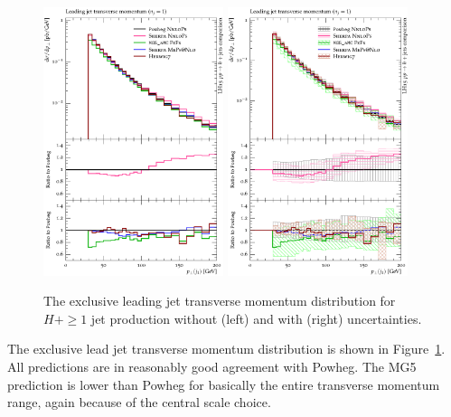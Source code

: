 \begin{figure}[t!]
  \centering
  \includegraphics[width=0.47\textwidth]{figures/hjetscomp_u_jet1_pT_excl.pdf}
  \hfill
  \includegraphics[width=0.47\textwidth]{figures/hjetscomp_jet1_pT_excl.pdf}
  \caption{
    The exclusive leading jet transverse momentum distribution for
    $H+\ge1$ jet production without (left) and with (right) uncertainties.
    \label{fig:higgscomp:results:1obs:j1pt_excl}
  }
\end{figure}

The exclusive lead jet transverse momentum distribution is shown in
Figure~\ref{fig:higgscomp:results:1obs:j1pt_excl}. All predictions are
in reasonably good agreement with Powheg. The MG5 prediction is lower
than Powheg for basically the entire transverse momentum range, again
because of the central scale choice.

